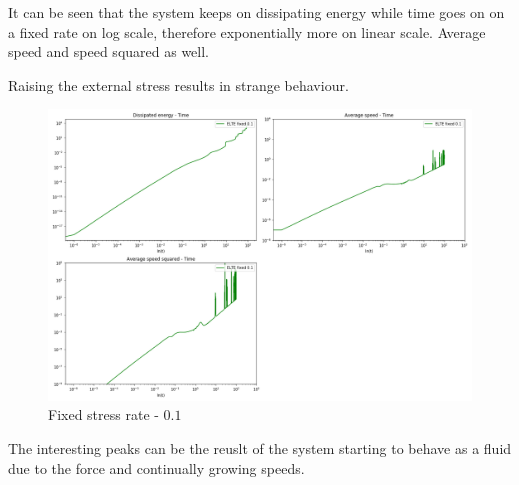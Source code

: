 \documentclass[12pt,a4paper]{article}
\theoremstyle{plain}
\begin{document}
\begin{multicols*}{2}
	\par It can be seen that the system keeps on dissipating energy while time goes on
	on a fixed rate on log scale, therefore exponentially more on linear scale. Average
	speed and speed squared as well.

	\par Raising the external stress results in strange behaviour.

	\begin{figure}[H]
		\centering
		\includegraphics[width=0.95\columnwidth]{all_elte_fixed_0_1.png}
		\caption{Fixed stress rate - $0.1$}
	\end{figure}

	\par The interesting peaks can be the reuslt of the system starting to behave 
	as a fluid due to the force and continually growing speeds.
	
\end{multicols*}
\end{document}
